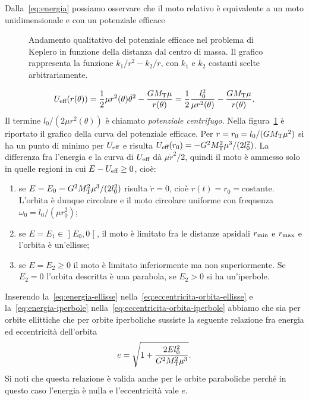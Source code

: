 Dalla~\eqref{eq:energia} possiamo osservare che il moto relativo è equivalente a
un moto unidimensionale e con un potenziale efficace
\begin{figure} %
  \centering
  
  \caption{Andamento qualitativo del potenziale efficace nel problema di Keplero
    in funzione della distanza dal centro di massa. Il grafico rappresenta la
    funzione $k_1/r^2-k_2/r$, con $k_1$ e $k_2$ costanti scelte
    arbitrariamente.}
  \label{fig:potenziale-efficace}
\end{figure}
\begin{equation}
  U_\textup{eff}(r(\theta)) = \frac{1}{2}\mu r^2(\theta)\dot{\theta}^2 -
  \frac{GM_\textup{T}\mu}{r(\theta)} = \frac{1}{2}\frac{l_0^2}{\mu r^2(\theta)} -
  \frac{GM_\textup{T}\mu}{r(\theta)}.
\end{equation}
Il termine $l_0/(2\mu r^2(\theta))$ è chiamato \emph{potenziale
  centrifugo}. Nella figura~\ref{fig:potenziale-efficace} è riportato il grafico
della curva del potenziale efficace. Per $r=r_0=l_0/(GM_\textup{T}\mu^2)$ si ha
un punto di minimo per $U_\textup{eff}$ e risulta $U_\textup{eff}(r_0) =
-G^2M_\textup{T}^2\mu^3/(2l_0^2)$. La differenza fra l'energia e la curva di
$U_\textup{eff}$ dà $\mu\dot{r}^2/2$, quindi il moto è ammesso solo in quelle
regioni in cui $E-U_\textup{eff}\geq 0$, cioè:
\begin{enumerate}
\item se $E = E_0 = G^2M_\textup{T}^2\mu^3/(2l_0^2)$ risulta $\dot{r}=0$, cioè
  $r(t) = r_0 = \text{costante}$. L'orbita è dunque circolare e il moto
  circolare uniforme con frequenza $\omega_0 = l_0/(\mu r_0^2)$;
\item se $E = E_1 \in \mathopen{]}E_0,0\mathclose{[}$, il moto è limitato fra le
  distanze apsidali $r_\textup{min}$ e $r_\textup{max}$ e l'orbita è un'ellisse;
\item se $E = E_2 \geq 0$ il moto è limitato inferiormente ma non
  superiormente. Se $E_2 = 0$ l'orbita descritta è una parabola, se $E_2>0$ si
  ha un'iperbole.
\end{enumerate}

Inserendo la~\eqref{eq:energia-ellisse}
nella~\eqref{eq:eccentricita-orbita-ellisse} e la~\eqref{eq:energia-iperbole}
nella~\eqref{eq:eccentricita-orbita-iperbole} abbiamo che sia per orbite
ellittiche che per orbite iperboliche sussiste la seguente relazione fra energia
ed eccentricità dell'orbita
\begin{equation}
  e = \sqrt{1+\frac{2El_0^2}{G^2M_\textup{T}^2\mu^3}}.
\end{equation}
Si noti che questa relazione è valida anche per le orbite paraboliche perché in
questo caso l'energia è nulla e l'eccentricità vale $e$.

